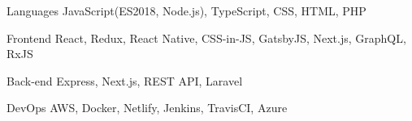 

\begin{cvskills}

  \cvskill
    {Languages} %
    {JavaScript(ES2018, Node.js), TypeScript, CSS, HTML, PHP} %

  \cvskill
    {Frontend} %
    {React, Redux, React Native, CSS-in-JS, GatsbyJS, Next.js, GraphQL, RxJS} %

  \cvskill
    {Back-end} %
    {Express, Next.js, REST API, Laravel} %

  \cvskill
  {DevOps} %
  {AWS, Docker, Netlify, Jenkins, TravisCI, Azure} %

\end{cvskills}
